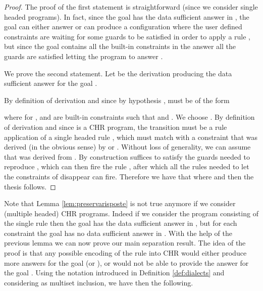 \begin{proof}
The proof of the first statement is straightforward (since we consider single headed programs). In fact, since the goal  has the data sufficient answer  in , the goal  can either answer  or can produce a configuration where the user defined constraints are waiting for some guards to be satisfied in order to apply a rule , but since the goal contains all the built-in constraints in the answer all the guards are satisfied letting the program to answer .

We prove the second statement.
Let   be the derivation producing the data sufficient answer  for the goal .

By definition of derivation and since by hypothesis ,
 must be of the form
 
where for ,  and   are built-in constraints such that
 and
.
We choose .
By definition of derivation and since  is a CHR program, the transition
 must be a rule application of a single headed rule , which must match with a constraint  that was derived (in the obvious sense) by  or . Without loss of generality, we can assume that  was derived from .
By construction  suffices to satisfy the guards needed to reproduce , which can then fire the rule , after which all the rules needed to let the constraints of  disappear can fire.
Therefore we have that  where  and then the thesis follows.
\end{proof}









 Note that Lemma \ref{lem:preservarisposte} is not true anymore if we consider (multiple headed) CHR programs.
 Indeed if we consider the program  consisting of the single rule  then the goal  has the data sufficient answer  in , but for each constraint  the goal   has no data sufficient answer in .
With the help of the previous lemma we can now prove our main separation result.
The idea of the proof is that any possible encoding of the  rule  into CHR would either produce more answers for the goal  (or ), or would not be able to provide the answer  for
the goal .
Using the notation introduced in Definition \ref{def:dialects} and considering  as multiset inclusion, we have then the following.


